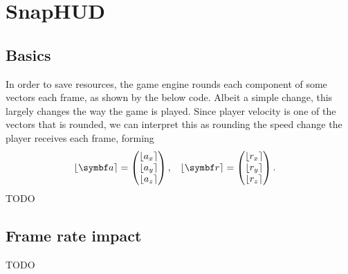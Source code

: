 \section{SnapHUD}
\label{sec:snaphud}

\subsection{Basics}
\label{sec:snap_basics}
In order to save resources, the game engine rounds each component of some vectors each frame, as shown by the below code. Albeit a simple change, this largely changes the way the game is played.
Since player velocity is one of the vectors that is rounded, we can interpret this as rounding the speed change the player receives each frame, forming
\begin{align*}
\round{\vec{a}} &=
\begin{pmatrix}
\lfloor a_x\rceil \\ \lfloor a_y\rceil \\ \lfloor a_z\rceil %
\end{pmatrix}, & \round{\vec{r}} &=
\begin{pmatrix}
\lfloor r_x\rceil \\ \lfloor r_y\rceil \\ \lfloor r_z\rceil
\end{pmatrix}.
\end{align*}
TODO


\subsection{Frame rate impact}
\label{sec:snap_frame_rate}
TODO

